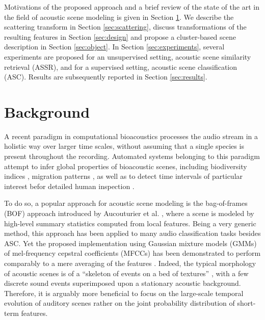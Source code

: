 \documentclass[journal]{IEEEtran}
\makeatletter
\newcommand*{\ie}{i.e.\@\xspace}
\makeatother
\begin{document}
Motivations of the proposed approach and a brief review of the state of the art in the field of acoustic scene modeling is given in Section \ref{sec:soa}. We describe the scattering transform in Section \ref{sec:scattering}, discuss transformations of the resulting features in Section \ref{sec:design} and propose a cluster-based scene description in Section \ref{sec:object}. In Section \ref{sec:experiments}, several experiments are proposed for an unsupervised setting, acoustic scene similarity retrieval (ASSR), and for a supervised setting, acoustic scene classification (ASC). Results are subsequently reported in Section \ref{sec:results}.

\section{Background} \label{sec:soa}


A recent paradigm in computational bioacoustics processes the audio stream in a holistic way over larger time scales, without assuming that a single species is present throughout the recording. Automated systems belonging to this paradigm attempt to infer global properties of bioacoustic scenes, including biodiversity indices \cite{Bardeli2010}, migration patterns \cite{Obrist2010}, as well as to detect time intervals of particular interest befor detailed human inspection \cite{rosenstock2002landbird,diefenbach2007incorporating}.

To do so, a popular approach for acoustic scene modeling is the bag-of-frames (BOF) approach introduced by Aucouturier et al. \cite{aucouturier2007bag}, where a scene is modeled by high-level summary statistics computed from local features.
Being a very generic method, this approach has been applied to many audio classification tasks besides ASC.
Yet the proposed implementation using Gaussian mixture models (GMMs) of mel-frequency cepstral coefficients (MFCCs) has been demonstrated to perform comparably to a mere averaging of the features \cite{lagrange:hal-01082501}.
Indeed, the typical morphology of acoustic scenes is of a ``skeleton of events on a bed of textures'' \cite{nelken2013}, with a few discrete sound events superimposed upon a stationary acoustic background.
Therefore, it is arguably more beneficial to focus on the large-scale temporal evolution of auditory scenes rather on the joint probability distribution of short-term features.
\end{document}
